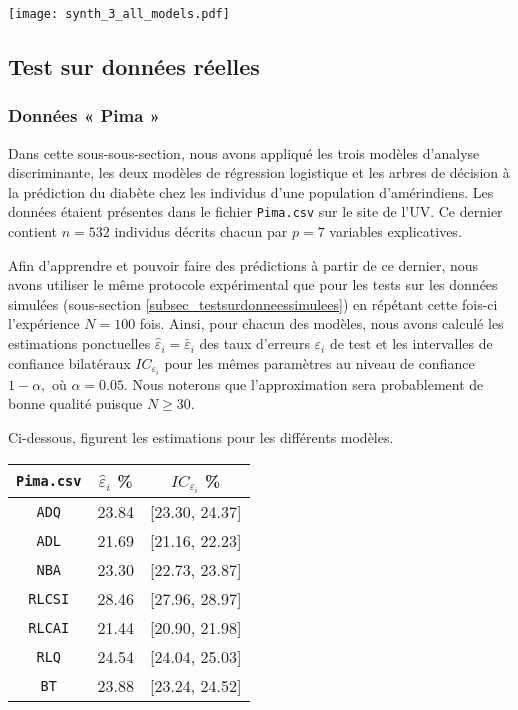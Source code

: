 \documentclass{article}
\begin{document}
\begin{multicols}{2}
\begingroup
   \centering
   \texttt{[image: synth\_3\_all\_models.pdf]}
\endgroup
\newpage
\subsection{Test sur données réelles}
\label{subsec_Testsurdonneesreelles}

\subsubsection{Données « Pima »}
\label{subsubsec_donneespima}
Dans cette sous-sous-section, nous avons appliqué les trois modèles d'analyse discriminante, les deux modèles de régression logistique et les arbres de décision à la prédiction du diabète chez les individus d'une population d'amérindiens. Les données étaient présentes dans le fichier \texttt{Pima.csv} sur le site de l'UV. Ce dernier contient $n = 532$ individus décrits chacun par $p = 7$ variables explicatives. 

Afin d'apprendre et pouvoir faire des prédictions à partir de ce dernier, nous avons utiliser le même protocole expérimental que pour les tests sur les données simulées (sous-section \ref{subsec_testsurdonneessimulees}) en répétant cette fois-ci l'expérience $N = 100$ fois. Ainsi, pour chacun des modèles, nous avons calculé les estimations ponctuelles  $\widehat{\varepsilon}_i = \bar{\varepsilon}_i$ des taux d’erreurs $\varepsilon_i$ de test et les intervalles de confiance bilatéraux $IC_{\varepsilon_{i}}$ pour les mêmes paramètres au niveau de confiance $1 - \alpha,$ où $\alpha = 0.05.$ Nous noterons que l'approximation sera probablement de bonne qualité puisque $N \geq 30.$

Ci-dessous, figurent les estimations pour les différents modèles.
\begin{center}
\begin{tabular}{| c || c | c |}
\hline
\texttt{Pima.csv} & $\widehat{\varepsilon}_i$ \% & $IC_{\varepsilon_{i}}$ \% \\
\hline
\hline
\texttt{ADQ} & 23.84 & [23.30, 24.37] \\
\hline
\texttt{ADL} & 21.69 & [21.16, 22.23] \\
\hline
\texttt{NBA} & 23.30 & [22.73, 23.87] \\
\hline
\texttt{RLCSI} & 28.46 & [27.96, 28.97] \\
\hline
\texttt{RLCAI} & 21.44 & [20.90, 21.98] \\
\hline
\texttt{RLQ} &  24.54 & [24.04, 25.03] \\
\hline
\texttt{BT} & 23.88 & [23.24, 24.52] \\
\hline
\end{tabular}\\ 
\label{table_Pima}
\end{center}


\end{multicols}
\end{document}

